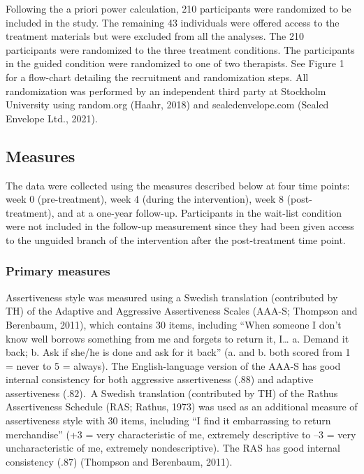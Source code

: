 \documentclass[3p]{elsarticle} %
\begin{document}
Following the a priori power calculation, 210 participants were
randomized to be included in the study. The remaining 43 individuals
were offered access to the treatment materials but were excluded from
all the analyses. The 210 participants were randomized to the three
treatment conditions. The participants in the guided condition were
randomized to one of two therapists. See Figure 1 for a flow-chart
detailing the recruitment and randomization steps. All randomization was
performed by an independent third party at Stockholm University using
random.org (Haahr, 2018) and sealedenvelope.com (Sealed Envelope Ltd.,
2021).

\hypertarget{measures}{%
\subsection{Measures}\label{measures}}

The data were collected using the measures described below at four time
points: week 0 (pre-treatment), week 4 (during the intervention), week 8
(post-treatment), and at a one-year follow-up. Participants in the
wait-list condition were not included in the follow-up measurement since
they had been given access to the unguided branch of the intervention
after the post-treatment time point.

\hypertarget{primary-measures}{%
\subsubsection{Primary measures}\label{primary-measures}}

Assertiveness style was measured using a Swedish translation
(contributed by TH) of the Adaptive and Aggressive Assertiveness Scales
(AAA-S; Thompson and Berenbaum, 2011), which contains 30 items,
including ``When someone I don't know well borrows something from me and
forgets to return it, I\ldots{} a. Demand it back; b. Ask if she/he is
done and ask for it back'' (a. and b. both scored from 1 = never to 5 =
always). \color{newtext}The English-language version of the AAA-S has
good internal consistency for both aggressive assertiveness (\(.88\))
and adaptive assertiveness (\(.82\)).\color{oldtext}~A Swedish
translation (contributed by TH) of the Rathus Assertiveness Schedule
(RAS; Rathus, 1973) was used as an additional measure of assertiveness
style with 30 items, including ``I find it embarrassing to return
merchandise'' (+3 = very characteristic of me, extremely descriptive to
--3 = very uncharacteristic of me, extremely nondescriptive). The RAS
has good internal consistency (\(.87\)) (Thompson and Berenbaum, 2011).
\end{document}
